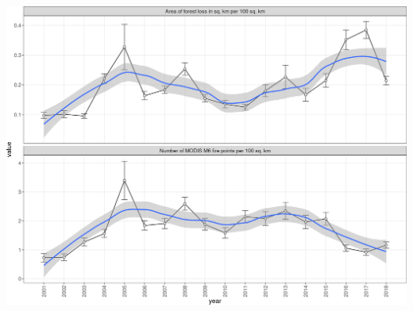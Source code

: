 \documentclass[10pt,landscape,a3paper]{article}
\begin{document}
\begin{center}\includegraphics{img/modelling/aa-eda-ts-20} \end{center}
\end{document}
